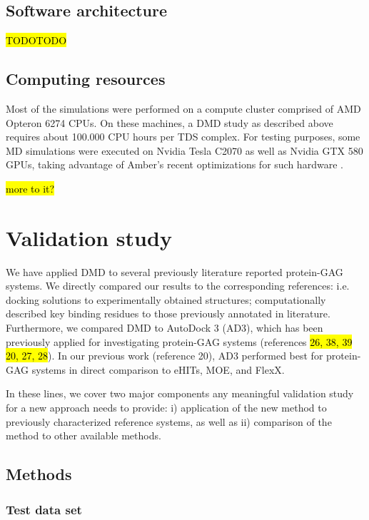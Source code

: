 \subsection{Software architecture}
\hl{TODOTODO}


\subsection{Computing resources}

Most of the simulations were performed on a compute cluster comprised of AMD
Opteron 6274 CPUs. On these machines, a DMD study as
described above requires about 100.000 CPU hours per TDS complex.
For testing purposes, some MD simulations were executed on Nvidia Tesla C2070
as well as Nvidia GTX 580 GPUs, taking advantage of Amber's recent optimizations
for such hardware \cite{amber_gpu_2012}.

\hl{more to it?}


\section{Validation study}

We have applied DMD to several previously literature reported protein-GAG
systems. We directly compared our results to the corresponding references: i.e.
docking solutions to experimentally obtained structures; computationally
described key binding residues to those previously annotated in literature.
Furthermore, we compared DMD to AutoDock 3 (AD3), which has been previously
applied for investigating protein-GAG systems (references \hl{ 26, 38, 39 20,
27, 28}). In our previous work (reference 20), AD3 performed best for protein-
GAG systems in direct comparison to eHITs, MOE, and FlexX.

In these lines, we cover two major components any meaningful
validation study for a new approach needs to provide: i) application of the new
method to previously characterized reference systems, as well as ii) comparison
of the method to other available methods.



\subsection{Methods}
\subsubsection{Test data set}

